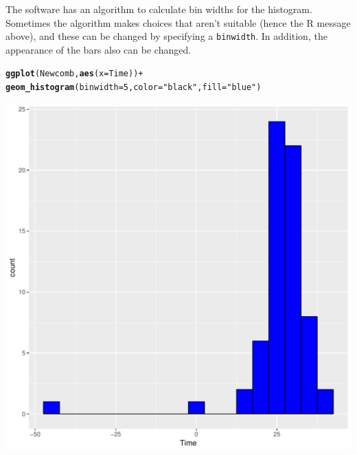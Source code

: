 \documentclass[12pt,oneside]{book}\usepackage[]{graphicx}\usepackage[]{color}
\makeatletter
\def\maxwidth{ %
  \ifdim\Gin@nat@width>\linewidth
    \linewidth
  \else
    \Gin@nat@width
  \fi
}
\newcommand{\hlnum}[1]{\textcolor[rgb]{0.686,0.059,0.569}{#1}}%
\newcommand{\hlstr}[1]{\textcolor[rgb]{0.192,0.494,0.8}{#1}}%
\newcommand{\hlopt}[1]{\textcolor[rgb]{0,0,0}{#1}}%
\newcommand{\hlstd}[1]{\textcolor[rgb]{0.345,0.345,0.345}{#1}}%
\newcommand{\hlkwc}[1]{\textcolor[rgb]{0.333,0.667,0.333}{#1}}%
\newcommand{\hlkwd}[1]{\textcolor[rgb]{0.737,0.353,0.396}{\textbf{#1}}}%
\newenvironment{kframe}{%
 \def\at@end@of@kframe{}%
 \ifinner\ifhmode%
  \def\at@end@of@kframe{\end{minipage}}%
  \begin{minipage}{\columnwidth}%
 \fi\fi%
 \def\FrameCommand##1{\hskip\@totalleftmargin \hskip-\fboxsep
 \colorbox{shadecolor}{##1}\hskip-\fboxsep
     \hskip-\linewidth \hskip-\@totalleftmargin \hskip\columnwidth}%
 \MakeFramed {\advance\hsize-\width
   \@totalleftmargin\z@ \linewidth\hsize
   \@setminipage}}%
 {\par\unskip\endMakeFramed%
 \at@end@of@kframe}
\newenvironment{knitrout}{}{} %
\makeatother
\begin{document}
The software has an algorithm to calculate bin widths for the histogram. Sometimes the algorithm makes choices that aren't suitable (hence the R message above), and these can be changed by specifying a \verb+binwidth+. In addition, the appearance of the bars also can be changed.

\begin{knitrout}
\color{fgcolor}\begin{kframe}
\begin{alltt}
\hlkwd{ggplot}\hlstd{(Newcomb,} \hlkwd{aes}\hlstd{(}\hlkwc{x} \hlstd{= Time))} \hlopt{+}
    \hlkwd{geom_histogram}\hlstd{(}\hlkwc{binwidth} \hlstd{=} \hlnum{5}\hlstd{,} \hlkwc{color} \hlstd{=} \hlstr{"black"}\hlstd{,} \hlkwc{fill} \hlstd{=} \hlstr{"blue"} \hlstd{)}
\end{alltt}
\end{kframe}
\includegraphics[width=\maxwidth]{figure/unnamed-chunk-77-1} 

\end{knitrout}
\end{document}
